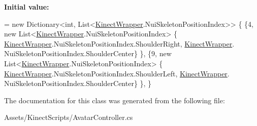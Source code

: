 {\bfseries Initial value\+:}
\begin{DoxyCode}
= \textcolor{keyword}{new} Dictionary<int, List<\mbox{\hyperlink{class_kinect_wrapper}{KinectWrapper}}.NuiSkeletonPositionIndex>>
    \{
        \{4, \textcolor{keyword}{new} List<\mbox{\hyperlink{class_kinect_wrapper}{KinectWrapper}}.NuiSkeletonPositionIndex> \{
      \mbox{\hyperlink{class_kinect_wrapper}{KinectWrapper}}.NuiSkeletonPositionIndex.ShoulderRight, \mbox{\hyperlink{class_kinect_wrapper}{KinectWrapper}}.
      NuiSkeletonPositionIndex.ShoulderCenter\} \},
        \{9, \textcolor{keyword}{new} List<\mbox{\hyperlink{class_kinect_wrapper}{KinectWrapper}}.NuiSkeletonPositionIndex> \{
      \mbox{\hyperlink{class_kinect_wrapper}{KinectWrapper}}.NuiSkeletonPositionIndex.ShoulderLeft, \mbox{\hyperlink{class_kinect_wrapper}{KinectWrapper}}.
      NuiSkeletonPositionIndex.ShoulderCenter\} \},
    \}
\end{DoxyCode}


The documentation for this class was generated from the following file\+:\begin{DoxyCompactItemize}
\item 
Assets/\+Kinect\+Scripts/Avatar\+Controller.\+cs\end{DoxyCompactItemize}
